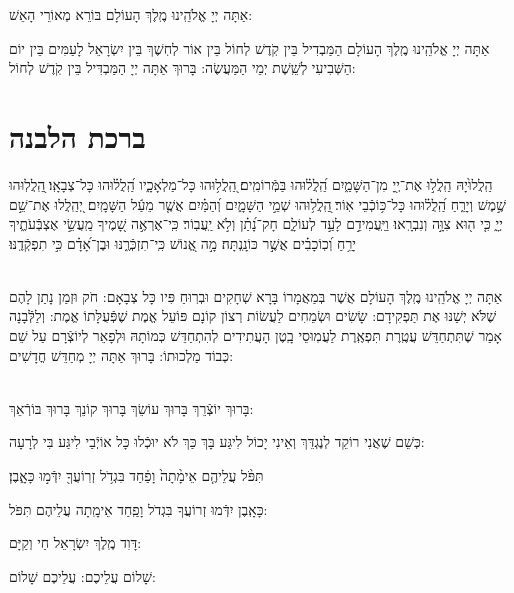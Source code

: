 \documentclass[twoside, openany, parskip=half, 11pt]{book}
\begin{document}
   אַתָּה יְיָ אֱלֹהֵֽינוּ מֶֽלֶךְ הָעוֹלָם בּוֹרֵא מְאוֹרֵי הָאֵשׁ:

   אַתָּה יְיָ אֱלֹהֵֽינוּ מֶֽלֶךְ הָעוֹלָם הַמַּבְדִיל בֵּין קֹֽדֶשׁ לְחוֹל בֵּין אוֹר לְחֽשֶׁךְ בֵּין יִשְׂרָאֵל לָעַמִּים בֵּין יוֹם הַשְּׁבִיעִי לְשֵֽׁשֶׁת יְמֵי הַמַּעֲשֶׂה: בָּרוּךְ אַתָּה יְיָ הַמַּבְדִּיל בֵּין קֹֽדֶשׁ לְחוֹל:
 \clearpage
 
 \vspace{-1.3\baselineskip}
\section[ברכת הלבנה]{ ברכת הלבנה }

הַֽלֲלוּ֙יָהּ הַֽלֲל֣וּ אֶת־יְ֖יָ מִן־הַשָּׁמַ֑יִם הַֽ֝לֲל֗וּהוּ בַּמְּֿרוֹמִֽים׃
  ֭הַֽלֲל֥וּהוּ כָּל־מַלְאָכָ֑יו הַֽ֝לֲל֗וּהוּ כָּל־צְבָאָֽו׃
   ֖הַֽלֲלֽוּהוּ שֶׁ֣מֶשׁ וְיָרֵ֑חַ הַֽ֝לֲל֗וּהוּ כָּל־כּ֥וֹכְֿבֵי אֽוֹר׃
    ֖הַֽלֲל֥וּהוּ שְׁמֵ֣י הַשָּׁמָ֑יִם וְ֝הַמַּ֗יִם אֲשֶׁ֤ר מֵעַ֬ל הַשָּׁמָֽיִם׃
     יְ֭הַֽלֲלוּ אֶת־שֵׁ֣ם יְיָ֑ כִּ֤י ה֖וּא צִוָּ֣ה וְנִבְרָֽאוּ׃
      וַיַּֽעֲמִידֵ֣ם לָעַ֣ד לְעוֹלָ֑ם חָק־נָ֝תַ֗ן וְלֹ֣א יַֽעֲבֽוֹר׃
 כִּֽי־אֶרְאֶ֣ה שָׁ֭מֶיךָ מַֽעֲשֵׂ֣י אֶצְבְּֿעֹתֶ֑יךָ יָרֵ֥חַ וְ֝כֽוֹכָבִ֗ים אֲשֶׁ֣ר כּוֹנָֽנְתָּה׃
  מָ֣ה אֱ֭נוֹשׁ כִּֽי־תִזְכְּֿרֶ֑נּוּ וּבֶן־אָ֝דָ֗ם כִּ֣י תִפְקְֿדֶֽנּוּ׃

\\
	 אַתָּה יְיָ אֱלֹהֵֽינוּ מֶֽלֶךְ הָעוֹלָם אֲשֶׁר בְּמַאֲמָרוֹ בָּרָא שְׁחָקִים וּבְרֽוּחַ פִּיו כָּל צְבָאָם: חֹק וּזְמַן נָתַן לָהֶם שֶׁלֹּא יְשַׁנּוּ אֶת תַּפְקִידָם: שָׂשִׂים וּשְׂמֵחִים לַעֲשׂוֹת רְצוֹן קוֹנָם פּוֹעֵל אֱמֶת שֶׁפְּֿעֻלָּתוֹ אֱמֶת: וְלַלְּֿבָנָה אָמַר שֶׁתִּתְחַדֵּשׁ עֲטֶֽרֶת תִּפְאֶֽרֶת לַעֲמֽוּסֵי בָֽטֶן הָעֲתִידִים לְהִתְחַדֵּשׁ כְּמוֹתָהּ וּלְפָאֵר לְיוֹצְֿרָם עַל שֵׁם כְּבוֹד מַלְכוּתוֹ: בָּרוּךְ אַתָּה יְיָ מְחַדֵּשׁ חֳדָשִׁים:

\\
בָּרוּךְ יוֹצְֿרֵךְ בָּרוּךְ עוֹשֵׂךְ בָּרוּךְ קוֹנֵךְ בָּרוּךְ בּוֹרְֿאֵךְ:

כְּשֵׁם שֶׁאֲנִי רוֹקֵד לְנֶגְדֵּךְ וְאֵינִי יָכוֹל לִיגַּע בָּךְ 
כַּךְ לֹא יוּכְֿלוּ כָּל אוֹיְֿבַי לִיגַּע בִּי לְרָעָה:

תִּפֹּ֨ל עֲלֵיהֶ֤ם אֵימָ֨תָה֙ וָפַ֔חַד בִּגְדֹ֥ל זְרֽוֹעֲךָ֖ יִדְּֿמ֣וּ כָּאָ֑בֶן׃


 כָּאָֽבֶן יִדְּֿמוּ זְרוֹעֲךָ בִּגְדֹל וָפַֽחַד אֵימָֽתָה עֲלֵיהֶם תִּפֹּל:


 דָּוִד מֶֽלֶךְ יִשְׂרָאֵל חַי וְקַיָּם:

 	שָׁלוֹם עֲלֵיכֶם: \qquad {} 
  עֲלֵיכֶם שָׁלוֹם:
\end{document}
